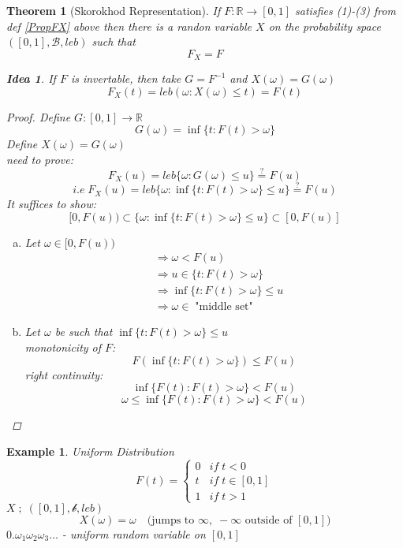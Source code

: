 \documentclass[12pt]{article}
\def\RR{\mathbb{R}}
\newtheorem{theorem}{Theorem}[section]
\newtheorem{example}{Example}[section]
\newtheorem*{idea}{Idea}
\begin{document}
\begin{theorem}[Skorokhod Representation]\label{sko}
If $F:\RR \rightarrow [0,1]$ satisfies (1)-(3) from def \ref{PropFX} above then there is a randon variable $X$ on the probability space $([0,1], \mathcal{B}, leb)$ such that
\[F_X = F\]
\begin{idea}
If $F$ is invertable, then take $G=F^{-1}$ and $X(\omega) = G(\omega)$
\[F_X(t) = leb(\omega:X(\omega) \leq t)=F(t)\]
\end{idea}
\begin{proof}
Define $G:[0,1] \rightarrow \RR$
\[G(\omega)= \inf\{t:F(t)> \omega\}\]
Define $X(\omega)=G(\omega)$\\
need to prove: 
\[F_X(u) =leb\{\omega :  G(\omega) \leq u\} \overset{?}{=} F(u)\]
\[i.e \;F_X(u) =leb\{\omega : \inf\{t :F(t)>\omega\}  \leq u\} \overset{?}{=} F(u)\]
It suffices to show:
\[ [0,F(u)) \subset \{\omega :\inf\{t :F(t)>\omega\}  \leq u\} \subset [0,F(u)] \]
\begin{enumerate}[(a)]
\item Let $\omega \in [0,F(u))$ \begin{align*} &\Rightarrow \omega <F(u)\\
&\Rightarrow u \in \{ t :  F(t)> \omega \}\\
&\Rightarrow \inf\{t :  F(t)> \omega \} \leq u \\
&\Rightarrow \omega \in \;\text{"middle set"}\end{align*}
\item Let $\omega$ be such that $\inf\{t :  F(t)> \omega \} \leq u$\\
monotonicity of $F$: \[F(\inf\{t :  F(t)> \omega \})\leq F(u)\]
right continuity:  \[\inf\{F(t) :  F(t)> \omega \} < F(u)\]
\[\omega \leq \inf\{F(t) :  F(t)> \omega \} < F(u)\]
\end{enumerate}
\end{proof}
\end{theorem}

\begin{example}
Uniform Distribution
\[F(t) = \begin{cases}
0 &if \; t<0\\
t &if \; t\in [0,1]\\
1 &if \; t > 1 \end{cases} \]
$X \; ; \; ([0,1], \mathcal{b}, leb)$
\[X(\omega) = \omega \quad \text{(jumps to $\infty, \; -\infty$ outside of $[0,1]$)}\]
$0.\omega_1\omega_2 \omega_3 \dots$ - uniform  random variable on $[0,1]$
\end{example}
\end{document}
